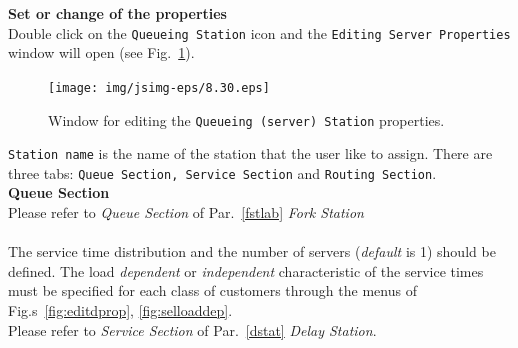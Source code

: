 \noindent \textbf{Set or change of the properties}\\
Double click on the \texttt{Queueing Station} icon and the
\texttt{Editing Server
Properties} window will open (see Fig.~\ref{fig:questatset}).\\
\begin{figure}[htb]
    \begin{center}
        \texttt{[image: img/jsimg-eps/8.30.eps]}
    \end{center}
    \caption{Window for editing the \texttt{Queueing (server) Station} properties.}
    \label{fig:questatset}
\end{figure}
\texttt{Station name} is the name of the station that the user
like to assign. There are three tabs: \texttt{Queue Section,
Service Section} and \texttt{Routing Section}.\\

\noindent \textbf{Queue Section}\\
Please refer to \emph{Queue Section} of Par.~\ref{fstlab} \emph{Fork Station}\\


\\
The service time
distribution and the number of servers (\emph{default} is 1)
should be defined. The load \emph{dependent} or \emph{independent}
characteristic of the service times must be specified for each
class of customers through the menus of Fig.s~\ref{fig:editdprop},
\ref{fig:selloaddep}.\\
Please refer to \emph{Service Section} of Par.~\ref{dstat} \emph{Delay Station}.\\




